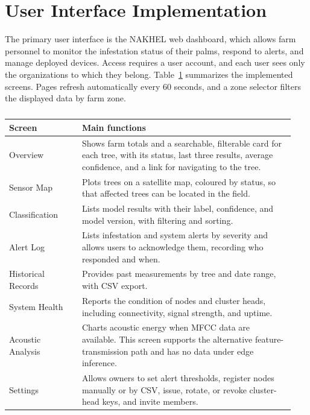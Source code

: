 \section{User Interface Implementation}
\label{sec:UIImplementation}

\begingroup
\color{black}

The primary user interface is the NAKHEL web dashboard, which allows farm personnel to monitor the infestation status of their palms, respond to alerts, and manage deployed devices. Access requires a user account, and each user sees only the organizations to which they belong. Table~\ref{tab:dashboard_screens} summarizes the implemented screens. Pages refresh automatically every 60 seconds, and a zone selector filters the displayed data by farm zone.

\begin{table}[htbp]
\color{black}
\centering
\small
\caption{}
\label{tab:dashboard_screens}
\renewcommand{\arraystretch}{1.2}
\begin{tabular}{@{} >{\raggedright\arraybackslash}p{0.24\linewidth} >{\raggedright\arraybackslash}p{0.70\linewidth} @{}}
\toprule
\textbf{Screen} & \textbf{Main functions} \\
\midrule
Overview & Shows farm totals and a searchable, filterable card for each tree, with its status, last three results, average confidence, and a link for navigating to the tree. \\
Sensor Map & Plots trees on a satellite map, coloured by status, so that affected trees can be located in the field. \\
Classification & Lists model results with their label, confidence, and model version, with filtering and sorting. \\
Alert Log & Lists infestation and system alerts by severity and allows users to acknowledge them, recording who responded and when. \\
Historical Records & Provides past measurements by tree and date range, with CSV export. \\
System Health & Reports the condition of nodes and cluster heads, including connectivity, signal strength, and uptime. \\
Acoustic Analysis & Charts acoustic energy when MFCC data are available. This screen supports the alternative feature-transmission path and has no data under edge inference. \\
Settings & Allows owners to set alert thresholds, register nodes manually or by CSV, issue, rotate, or revoke cluster-head keys, and invite members. \\
\bottomrule
\end{tabular}
\end{table}
\FloatBarrier

